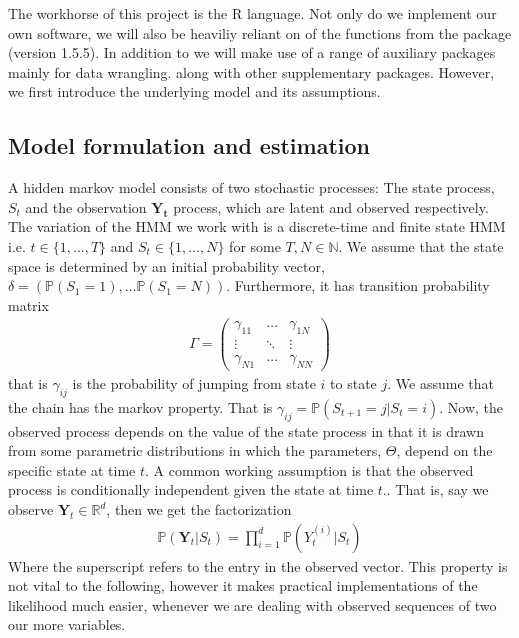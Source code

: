 The workhorse of this project is the R language.\cite{RLang}
Not only do we implement our own software, we will also be heaviliy reliant on of the functions from the package  \cite{momentuHMM} (version 1.5.5). In addition to  we will make use of a range of auxiliary packages mainly for data wrangling.\cite{tidyverse}\cite{Rcpp} along with other supplementary packages.\cite{gridExtra}\cite{microbenchmark}\cite{ggthemes}\cite{ggmap}\cite{mapview} However, we first introduce the underlying model and its assumptions.
\subsection{Model formulation and estimation}
A hidden markov model consists of two stochastic processes: The state process, $S_t$ and the observation $\mathbf{Y_t}$ process, which are latent and observed respectively. The variation of the HMM we work with is a discrete-time and finite state HMM i.e. $t\in\{1,\dots , T\}$ and $S_t\in\{1,\dots , N\}$ for some $T, N\in\mathbb{N}$. We assume that the state space is determined by an initial probability vector, $\delta = \left(\mathbb{P}(S_1 = 1),\dots \mathbb{P}(S_1 = N)\right)$. Furthermore, it has transition probability matrix
\begin{align}
    \Gamma = \begin{pmatrix}
        \gamma_{11} & \dots &  \gamma_{1N} \\
        \vdots & \ddots & \vdots \\
        \gamma_{N1} & \dots & \gamma_{NN}
    \end{pmatrix} \label{Gamma1}
\end{align}
that is $\gamma_{ij}$ is the probability of jumping from state $i$ to state $j$. We assume that the chain has the markov property. That is $\gamma_{ij} = \mathbb{P}\left(S_{t+1} = j | S_t = i\right)$. Now, the observed process depends on the value of the state process in that it is drawn from some parametric distributions in which the parameters, $\Theta$, depend on the specific state at time $t$.
A common working assumption is that the observed process is conditionally independent given the state at time $t$.\cite{UncoveringEcologicalState}. That is, say we observe $\mathbf{Y}_t\in\mathbb{R}^d$, then we get the factorization
\begin{align}\mathbb{P}(\mathbf{Y}_t | S_t) = \prod_{i = 1}^{d} \mathbb{P}(Y_t^{(i)} | S_t)
\end{align}
Where the superscript refers to the entry in the observed vector. This property is not vital to the following, however it makes practical implementations of the likelihood much easier, whenever we are dealing with observed sequences of two our more variables.
